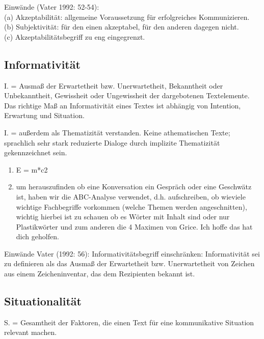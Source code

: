 \documentclass[
  letterpaper,
]{scrbook}
\providecommand{\tightlist}{%
  \setlength{\itemsep}{0pt}\setlength{\parskip}{0pt}}\usepackage{longtable,booktabs,array}
\begin{document}
Einwände (Vater 1992: 52-54):\\
(a) Akzeptabilität: allgemeine Voraussetzung für erfolgreiches
Kommunizieren.\\
(b) Subjektivität: für den einen akzeptabel, für den anderen dagegen
nicht.\\
(c) Akzeptabilitätsbegriff zu eng eingegrenzt.

\hypertarget{informativituxe4t}{%
\subsection{Informativität}\label{informativituxe4t}}

I. = Ausmaß der Erwartetheit bzw. Unerwartetheit, Bekanntheit oder
Unbekanntheit, Gewissheit oder Ungewissheit der dargebotenen
Textelemente. Das richtige Maß an Informativität eines Textes ist
abhängig von Intention, Erwartung und Situation.

I. = außerdem als Thematizität verstanden. Keine athematischen Texte;
sprachlich sehr stark reduzierte Dialoge durch implizite Thematizität
gekennzeichnet sein.

\begin{enumerate}
\def\labelenumi{(\arabic{enumi})}
\setcounter{enumi}{16}
\tightlist
\item
  E = m*c2\\
\item
  um herauszufinden ob eine Konversation ein Gespräch oder eine
  Geschwätz ist, haben wir die ABC-Analyse verwendet, d.h. aufschreiben,
  ob wieviele wichtige Fachbegriffe vorkommen (welche Themen werden
  angeschnitten), wichtig hierbei ist zu schauen ob es Wörter mit Inhalt
  sind oder nur Plastikwörter und zum anderen die 4 Maximen von Grice.
  Ich hoffe das hat dich geholfen.\\
\end{enumerate}

Einwände Vater (1992: 56): Informativitätsbegriff einschränken:
Informativität sei zu definieren als das Ausmaß der Erwartetheit bzw.
Unerwartetheit von Zeichen aus einem Zeicheninventar, das dem
Rezipienten bekannt ist.

\hypertarget{situationalituxe4t}{%
\subsection{Situationalität}\label{situationalituxe4t}}

S. = Gesamtheit der Faktoren, die einen Text für eine kommunikative
Situation relevant machen.
\end{document}
